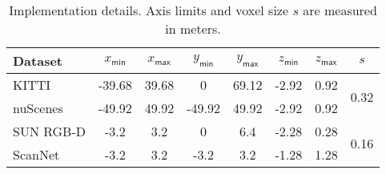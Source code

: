\documentclass[10pt,twocolumn,letterpaper]{article}
\begin{document}
\begin{table}[!ht]
    \centering \small
    \begingroup \setlength{\tabcolsep}{2pt}
    \begin{tabular}{l|cccccc|c}
    \hline
    Dataset & $x_\mathsf{min}$ & $x_\mathsf{max}$ & $y_\mathsf{min}$ & $y_\mathsf{max}$ & $z_\mathsf{min}$ & $z_\mathsf{max}$ & $s$ \\ \hline
    KITTI & -39.68 & 39.68 & 0 & 69.12 & -2.92 & 0.92 & \multirow[c]{2}{*}{0.32} \\
    nuScenes & -49.92 & 49.92 & -49.92 & 49.92 & -2.92 & 0.92 & \\
    SUN RGB-D & -3.2 & 3.2 & 0 & 6.4 & -2.28 & 0.28 & \multirow[c]{2}{*}{0.16} \\
    ScanNet & -3.2 & 3.2 & -3.2 & 3.2 & -1.28 & 1.28 & \\ \hline
    \end{tabular} \endgroup
    \caption{Implementation details. Axis limits and voxel size $s$ are measured in meters.}
    \label{tab:implementation}
\end{table}
\end{document}
